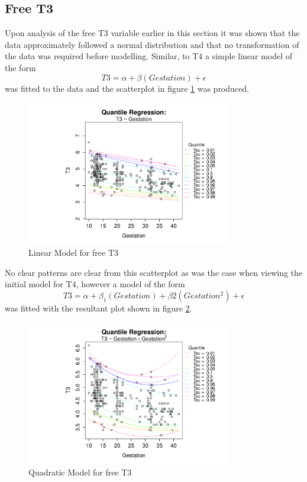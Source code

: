 \documentclass[12pt,a4paper]{report}
\begin{document}
\subsection{Free T3}
Upon analysis of the free T$3$ variable earlier in this section it was shown that the data approximately followed a normal distribution and that no transformation of the data was required before modelling. Similar, to T$4$ a simple linear model of the form
$$ T3 = \alpha + \beta(Gestation) + \epsilon$$
was fitted to the data and the scatterplot in figure \ref{QR:T3Model1} was produced.
\vspace{2mm}

\begin{figure}[ht]\centering
    \includegraphics[width=9cm]{QRT3Model1.pdf}
    \caption{Linear Model for free T3}
    \label{QR:T3Model1}
\end{figure}
\vspace{2mm}

No clear patterns are clear from this scatterplot as was the case when viewing the initial model for T$4$, however a model of the form
$$ T3 = \alpha + \beta_{1}(Gestation) + \beta{2}(Gestation^{2}) + \epsilon$$
was fitted with the resultant plot shown in figure \ref{QR:T3Model2}.
\vspace{2mm}

\begin{figure}[ht]\centering
    \includegraphics[width=9cm]{QRT3Model2.pdf}
   \caption{Quadratic Model for free T3}
    \label{QR:T3Model2}
\end{figure}
\vspace{2mm}
\end{document}
